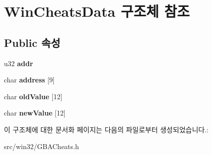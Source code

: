 \hypertarget{struct_win_cheats_data}{}\section{Win\+Cheats\+Data 구조체 참조}
\label{struct_win_cheats_data}
\subsection*{Public 속성}
\begin{DoxyCompactItemize}
\item 
\mbox{\label{struct_win_cheats_data_ace7d56c82bf83c2d88a5c1d6555b0b50}} 
u32 {\bfseries addr}
\item 
\mbox{\label{struct_win_cheats_data_aee18406386236acfb28aa838a027b5b2}} 
char {\bfseries address} \mbox{[}9\mbox{]}
\item 
\mbox{\label{struct_win_cheats_data_a62b624b83f4613d5753d49b4c9fcf0f1}} 
char {\bfseries old\+Value} \mbox{[}12\mbox{]}
\item 
\mbox{\label{struct_win_cheats_data_ae00918c0a8daa1d847eaac10d63fd559}} 
char {\bfseries new\+Value} \mbox{[}12\mbox{]}
\end{DoxyCompactItemize}


이 구조체에 대한 문서화 페이지는 다음의 파일로부터 생성되었습니다.\+:\begin{DoxyCompactItemize}
\item 
src/win32/G\+B\+A\+Cheats.\+h\end{DoxyCompactItemize}
